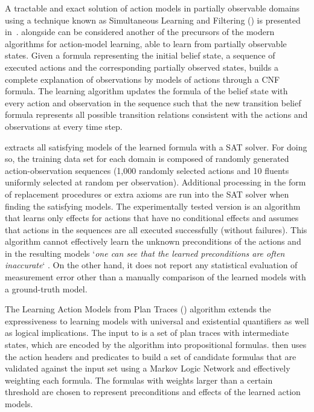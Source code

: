A tractable and exact solution of action models in partially observable domains using a technique known as Simultaneous Learning and Filtering (\textbf{\SLAF}) is presented in~\cite{AmirC08}. \SLAF alongside \ARMS can be considered another of the precursors of the modern algorithms for action-model learning, able to learn from partially observable states. Given a formula representing the initial belief state, a sequence of executed actions and the corresponding partially observed states, \SLAF builds a complete explanation of observations by models of actions through a CNF formula. The learning algorithm updates the formula of the belief state with every action and observation in the sequence such that the new transition belief formula represents all possible transition relations consistent with the actions and observations at every time step.

\SLAF extracts all satisfying models of the learned formula with a SAT solver. For doing so, the training data set for each domain is composed of randomly generated action-observation sequences  (1,000 randomly selected actions and 10 fluents uniformly selected at random per observation). Additional processing in the form of replacement procedures or extra axioms are run into the SAT solver when finding the satisfying models. The experimentally tested \SLAF version is an algorithm that learns only effects for actions that have no conditional effects and assumes that actions in the sequences are all executed successfully (without failures). This algorithm cannot effectively learn the unknown preconditions of the actions and in the resulting models `\emph{one can see that the learned preconditions are often inaccurate}` \cite{AmirC08}. On the other hand, it does not report any statistical evaluation of measurement error other than a manually comparison of the learned models with a ground-truth model.

The Learning Action Models from Plan Traces (\textbf{\LAMP}) \cite{ZhuoYHL10} algorithm extends the expressiveness to learning models with universal and existential quantifiers as well as logical implications. The input to \LAMP is a set of plan traces with intermediate states, which are encoded by the algorithm into propositional formulas. \LAMP then uses the action headers and predicates to build a set of candidate formulas that are validated against the input set using a Markov Logic Network and effectively weighting each formula. The formulas with weights larger than a certain threshold are chosen to represent preconditions and effects of the learned action models.

